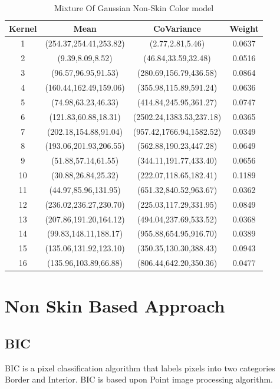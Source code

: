 \begin{table}[h]
\begin{tabular}{|c|c|c|c|}
\hline
Kernel &Mean &CoVariance &Weight \\ \hline
1 &(254.37,254.41,253.82) &(2.77,2.81,5.46) &0.0637 \\
2 &(9.39,8.09,8.52) &(46.84,33.59,32.48) &0.0516 \\
3 &(96.57,96.95,91.53) &(280.69,156.79,436.58) &0.0864 \\
4 &(160.44,162.49,159.06) &(355.98,115.89,591.24) &0.0636 \\
5 &(74.98,63.23,46.33) &(414.84,245.95,361.27) &0.0747 \\
6 &(121.83,60.88,18.31) &(2502.24,1383.53,237.18) &0.0365 \\
7 &(202.18,154.88,91.04) &(957.42,1766.94,1582.52) &0.0349 \\
8 &(193.06,201.93,206.55) &(562.88,190.23,447.28) &0.0649 \\
9 &(51.88,57.14,61.55) &(344.11,191.77,433.40) &0.0656 \\
10 &(30.88,26.84,25.32) &(222.07,118.65,182.41) &0.1189 \\
11 &(44.97,85.96,131.95) &(651.32,840.52,963.67) &0.0362 \\
12 &(236.02,236.27,230.70) &(225.03,117.29,331.95) &0.0849 \\
13 &(207.86,191.20,164.12) &(494.04,237.69,533.52) &0.0368 \\
14 &(99.83,148.11,188.17) &(955.88,654.95,916.70) &0.0389 \\
15 &(135.06,131.92,123.10) &(350.35,130.30,388.43) &0.0943 \\
16 &(135.96,103.89,66.88) &(806.44,642.20,350.36) &0.0477 \\
\hline
\end{tabular}
\caption{Mixture Of Gaussian Non-Skin Color model}
\label{tab:GMMNonSkin}
\end{table} 


\section {Non Skin Based Approach}


\subsection {BIC}
BIC is a pixel classification algorithm that labels pixels into two categories Border and Interior. BIC is based upon Point image processing algorithm.

